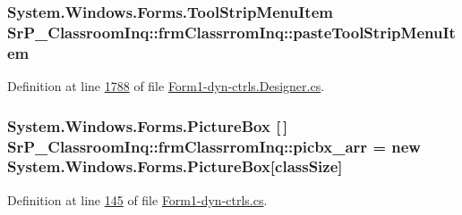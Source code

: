 \hypertarget{class_sr_p___classroom_inq_1_1frm_classrrom_inq_a6cd3b1f68a59b97544531e749b77e868}{
\subsubsection[{paste\-Tool\-Strip\-Menu\-Item}]{\setlength{\rightskip}{0pt plus 5cm}\-System.\-Windows.\-Forms.\-Tool\-Strip\-Menu\-Item {\bf \-Sr\-P\-\_\-\-Classroom\-Inq\-::frm\-Classrrom\-Inq\-::paste\-Tool\-Strip\-Menu\-Item}}}
\label{class_sr_p___classroom_inq_1_1frm_classrrom_inq_a6cd3b1f68a59b97544531e749b77e868}


\-Definition at line \hyperlink{_form1-dyn-ctrls_8_designer_8cs_source_l01788}{1788} of file \hyperlink{_form1-dyn-ctrls_8_designer_8cs_source}{\-Form1-\/dyn-\/ctrls.\-Designer.\-cs}.

\hypertarget{class_sr_p___classroom_inq_1_1frm_classrrom_inq_a067a85853fc3e38cf6343917c4fb061a}{
\subsubsection[{picbx\-\_\-arr}]{\setlength{\rightskip}{0pt plus 5cm}\-System.\-Windows.\-Forms.\-Picture\-Box \mbox{[}$\,$\mbox{]} {\bf \-Sr\-P\-\_\-\-Classroom\-Inq\-::frm\-Classrrom\-Inq\-::picbx\-\_\-arr} = new \-System.\-Windows.\-Forms.\-Picture\-Box\mbox{[}{\bf class\-Size}\mbox{]}}}
\label{class_sr_p___classroom_inq_1_1frm_classrrom_inq_a067a85853fc3e38cf6343917c4fb061a}


\-Definition at line \hyperlink{_form1-dyn-ctrls_8cs_source_l00145}{145} of file \hyperlink{_form1-dyn-ctrls_8cs_source}{\-Form1-\/dyn-\/ctrls.\-cs}.


